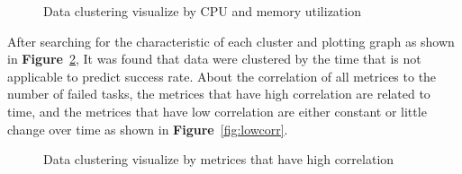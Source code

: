 \documentclass[12pt,oneside,openright,a4paper]{cpe-english-project}
\begin{document}
\begin{figure}[!h]\centering
    \setlength{\fboxrule}{0mm} %
    \setlength{\fboxsep}{0cm}
    \caption{Data clustering visualize by CPU and memory utilization}\label{fig:cluster}
\end{figure}

\newpage

\hspace{10mm}After searching for the characteristic of each cluster and plotting graph as shown in \textbf{Figure}~\ref{fig:highcorr}, It was found that data were clustered by the time that is not applicable to predict success rate. About the correlation of all metrices to the number of failed tasks, the metrices that have high correlation are related to time, and the metrices that have low correlation are either constant or little change over time as shown in \textbf{Figure}~\ref{fig:lowcorr}.

\begin{figure}[!h]\centering
    \setlength{\fboxrule}{0mm} %
    \setlength{\fboxsep}{0cm}
    \caption{Data clustering visualize by metrices that have high correlation}\label{fig:highcorr}
\end{figure}
\end{document}
